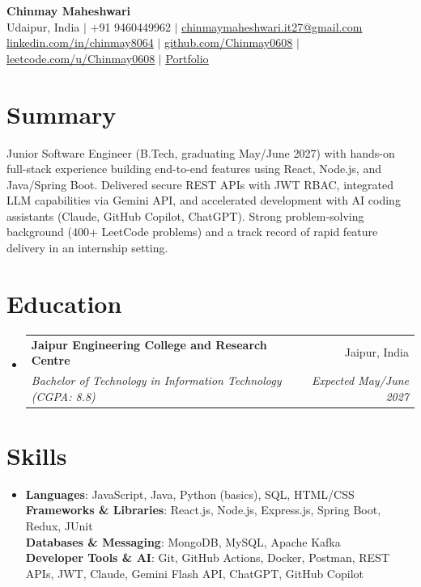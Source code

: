 \documentclass[letterpaper,12pt]{article}
\makeatletter
\newcommand{\resumeSubheading}[4]{
  \vspace{-2pt}\item
    \begin{tabular*}{0.98\textwidth}[t]{l@{\extracolsep{\fill}}r}
      \textbf{#1} & #2 \\
      \textit{#3} & \textit{#4} \\
    \end{tabular*}\vspace{-6pt}
}
\newcommand{\resumeSubHeadingListStart}{\begin{itemize}[leftmargin=0.15in, label={}]}
\newcommand{\resumeSubHeadingListEnd}{\end{itemize}}
\makeatother
\begin{document}
\begin{center}
    \textbf{\Huge Chinmay Maheshwari} \\ \vspace{2pt}
    \small Udaipur, India $|$ +91 9460449962 $|$ \href{mailto:chinmaymaheshwari.it27@gmail.com}{\underline{chinmaymaheshwari.it27@gmail.com}} \\ \vspace{1pt}
    \href{https://linkedin.com/in/chinmay8064/}{\underline{linkedin.com/in/chinmay8064}} $|$ 
    \href{https://github.com/Chinmay0608}{\underline{github.com/Chinmay0608}} $|$ 
    \href{https://leetcode.com/u/Chinmay0608/}{\underline{leetcode.com/u/Chinmay0608}} $|$
    \href{https://portfolio-olive-nine-39.vercel.app}{\underline{Portfolio}}
\end{center}

\section{Summary}
Junior Software Engineer (B.Tech, graduating May/June 2027) with hands-on full-stack experience building end-to-end features using React, Node.js, and Java/Spring Boot. Delivered secure REST APIs with JWT RBAC, integrated LLM capabilities via Gemini API, and accelerated development with AI coding assistants (Claude, GitHub Copilot, ChatGPT). Strong problem-solving background (400+ LeetCode problems) and a track record of rapid feature delivery in an internship setting.

\section{Education}
  \resumeSubHeadingListStart
    \resumeSubheading
      {Jaipur Engineering College and Research Centre}{Jaipur, India}
      {Bachelor of Technology in Information Technology (CGPA: 8.8)}{Expected May/June 2027}
  \resumeSubHeadingListEnd

\section{Skills}
 \begin{itemize}[leftmargin=0.15in, label={}]
    \item{
     \textbf{Languages}{: JavaScript, Java, Python (basics), SQL, HTML/CSS} \\
     \textbf{Frameworks \& Libraries}{: React.js, Node.js, Express.js, Spring Boot, Redux, JUnit} \\
     \textbf{Databases \& Messaging}{: MongoDB, MySQL, Apache Kafka} \\
     \textbf{Developer Tools \& AI}{: Git, GitHub Actions, Docker, Postman, REST APIs, JWT, Claude, Gemini Flash API, ChatGPT, GitHub Copilot}
    }
 \end{itemize}
\end{document}
